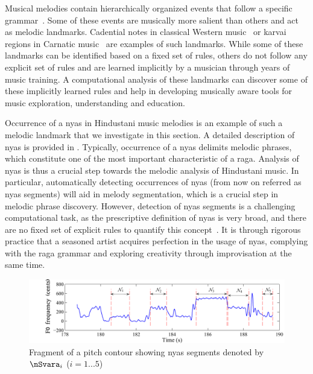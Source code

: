 {Musical melodies contain hierarchically organized events that follow a specific grammar~\citep{Patel07BOOK}. Some of these events are musically more salient than others and act as melodic landmarks. Cadential notes in classical Western music~\citep{GroveCadence} or \gls{karvai} regions in Carnatic music~\citep{sambamoorthy:1998} are examples of such landmarks. While some of these landmarks can be identified based on a fixed set of rules, others do not follow any explicit set of rules and are learned implicitly by a musician through years of music training. A computational analysis of these landmarks can discover some of these implicitly learned rules and help in developing musically aware tools for music exploration, understanding and education. 

Occurrence of a \gls{nyas} in Hindustani music melodies is an example of such a melodic landmark that we investigate in this section. A detailed description of \gls{nyas} is provided in . Typically, occurrence of a \gls{nyas} delimits melodic phrases, which constitute one of the most important characteristic of a \gls{raga}. Analysis of \gls{nyas} is thus a crucial step towards the melodic analysis of Hindustani music. In particular, automatically detecting occurrences of \gls{nyas} (from now on referred as \gls{nyas} segments) will aid in melody segmentation, which is a crucial step in melodic phrase discovery. However, detection of \gls{nyas} segments is a challenging computational task, as the prescriptive definition of \gls{nyas} is very broad, and there are no fixed set of explicit rules to quantify this concept~\citep[p. 73]{Dey2008}. It is through rigorous practice that a seasoned artist acquires perfection in the usage of \gls{nyas}, complying with the \gls{raga} grammar and exploring creativity through improvisation at the same time. 


\begin{figure}
	\begin{center}
		\includegraphics[width=\figSizeHundred]{ch05_preprocessing/figures/NyasFragmentChallenge.pdf}
	\end{center}
	\caption[Fragment of a pitch contour showing \gls{nyas} segments]{Fragment of a pitch contour showing \gls{nyas} segments denoted by $\nSvara_i$ ($i={1...5}$)}
	\label{fig:nyas_segments_example}
\end{figure}

}
